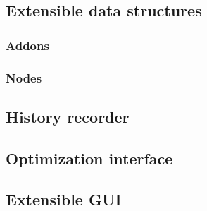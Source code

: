 \subsection{Extensible data structures}
\subsubsection{Addons}
\label{sec:addons}
\subsubsection{Nodes}
\label{sec:nodes}
\subsection{History recorder}
\subsection{Optimization interface}
\label{sec:optimizer}
\subsection{Extensible GUI}
